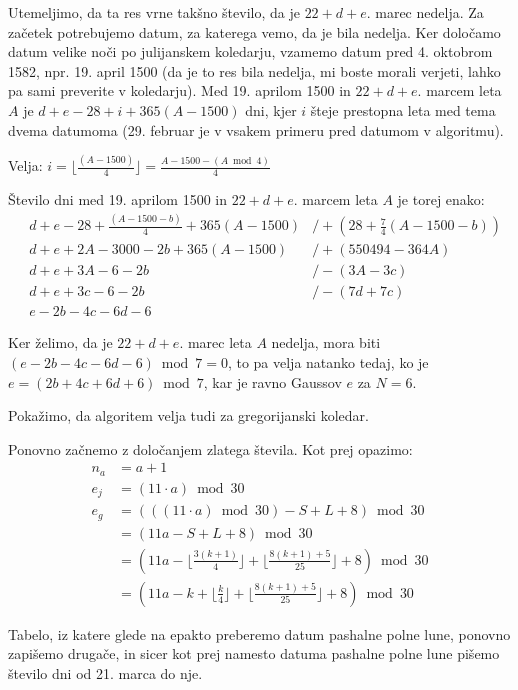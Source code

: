 \documentclass[a4paper,12pt]{article}
\begin{document}
Utemeljimo, da ta res vrne takšno število, da je $22 + d + e$. marec nedelja. 
Za začetek potrebujemo datum, za katerega vemo, da je bila nedelja. Ker 
določamo datum velike noči po julijanskem koledarju, vzamemo datum pred 
4. oktobrom 1582, npr. 19. april 1500 (da je to res bila nedelja, mi boste 
morali verjeti, lahko pa sami preverite v koledarju). Med 19. aprilom 1500 
in $22 + d + e$. marcem leta $A$ je $d + e - 28 + i + 365(A - 1500)$ dni, 
kjer $i$ šteje prestopna leta med tema dvema datumoma (29. februar je v vsakem 
primeru pred datumom v algoritmu). 

Velja: $i = \lfloor \displaystyle \frac{(A - 1500)}{4} \rfloor = \frac{A - 1500 - (A \bmod 4)}{4}$

Število dni med 19. aprilom 1500 in $22 + d + e$. marcem leta $A$ je torej enako:
\begin{align*}
    &d + e - 28 + \frac{(A - 1500 - b)}{4} + 365(A - 1500) &/ + (28 + \frac{7}{4} (A - 1500 - b)) \\
    &d + e + 2 A - 3000 - 2b + 365(A - 1500) &/ + (550494 - 364 A) \\
    &d + e + 3 A - 6 - 2b &/ - (3 A - 3c) \\
    &d + e + 3c - 6 - 2b &/ - (7d + 7c) \\
    &e - 2b - 4c - 6d - 6
\end{align*}

Ker želimo, da je $22 + d + e$. marec leta $A$ nedelja, mora biti 
$(e - 2b - 4c - 6d - 6) \bmod 7 = 0$, to pa velja natanko tedaj, ko je
$e = (2b + 4c + 6d + 6) \bmod 7$, kar je ravno Gaussov $e$ za $N=6$.

Pokažimo, da algoritem velja tudi za gregorijanski koledar.

Ponovno začnemo z določanjem zlatega števila. Kot prej opazimo:
\begin{align*}
    n_a &= a + 1 \\
    e_j &= (11 \cdot a) \bmod 30 \\
    e_g &= (((11 \cdot a) \bmod 30) - S + L + 8) \bmod 30 \\
        &= (11a - S + L + 8) \bmod 30 \\
        &= (11a - \lfloor \frac{3 (k + 1)}{4} \rfloor + \lfloor \frac{8 (k + 1) + 5}{25} \rfloor + 8) \bmod 30 \\
        &= (11a - k + \lfloor \frac{k}{4} \rfloor + \lfloor \frac{8 (k + 1) + 5}{25} \rfloor + 8) \bmod 30
\end{align*}

Tabelo, iz katere glede na epakto preberemo datum pashalne polne lune, ponovno
zapišemo drugače, in sicer kot prej namesto datuma pashalne polne lune 
pišemo število dni od 21. marca do nje.
\end{document}
